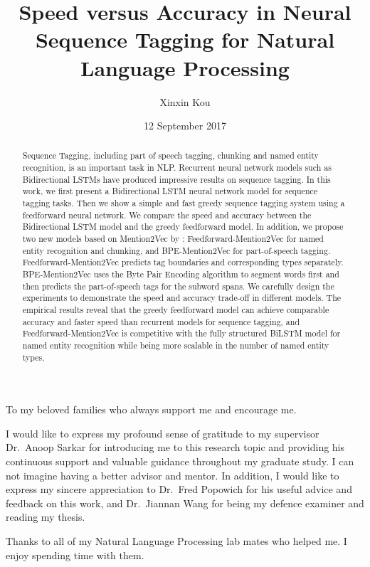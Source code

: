 \documentclass{sfuthesis}
\title{Speed versus Accuracy in Neural Sequence Tagging for Natural Language Processing}
\author{Xinxin Kou}
\date{12 September 2017}
\newcommand{\ma}{Feedforward-Mention2Vec}
\newcommand{\mb}{BPE-Mention2Vec}
\begin{document}
\frontmatter
\maketitle{}
\makecommittee{}


\begin{abstract}
Sequence Tagging, including part of speech tagging, chunking and named entity recognition, is an important task in NLP. Recurrent neural network models such as Bidirectional LSTMs have produced impressive results on sequence tagging. In this work, we first present a Bidirectional LSTM neural network model for sequence tagging tasks. Then we show a simple and fast greedy sequence tagging system using a feedforward neural network. We compare the speed and accuracy between the Bidirectional LSTM model and the greedy feedforward model. In addition, we propose two new models based on Mention2Vec by \cite{stratos2016mention2vec}: \ma{} for named entity recognition and chunking, and \mb{} for part-of-speech tagging. \ma{} predicts tag boundaries and corresponding types separately. \mb{} uses the Byte Pair Encoding algorithm to segment words first and then predicts the part-of-speech tags for the subword spans. We carefully design the experiments to demonstrate the speed and accuracy trade-off in different models. The empirical results reveal that the greedy feedforward model can achieve comparable accuracy and faster speed than recurrent models for sequence tagging, and \ma{} is competitive with the fully structured BiLSTM model for named entity recognition while being more scalable in the number of named entity types.

\end{abstract}

\begin{dedication} %

To my beloved families who always support me and encourage me. 

\end{dedication}

\begin{acknowledgements} %

I would like to express my profound sense of gratitude to my supervisor Dr.\ Anoop Sarkar for introducing me to this research topic and providing his continuous support and valuable guidance throughout my graduate study. I can not imagine having a better advisor and mentor. In addition, I would like to express my sincere appreciation to Dr.\ Fred Popowich for his useful advice and feedback on this work, and Dr.\ Jiannan Wang for being my defence examiner and reading my thesis.

Thanks to all of my Natural Language Processing lab mates who helped me. I enjoy spending time with them. 


\end{acknowledgements}
\end{document}
